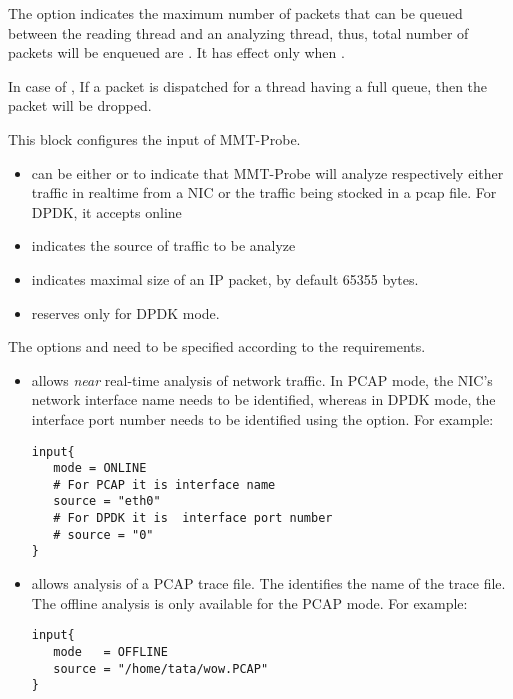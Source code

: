 The option indicates the maximum number of packets that can be queued between the reading thread and an analyzing thread,
thus, total number of packets will be enqueued are .
It has effect only when .

In case of , 
If a packet is dispatched for a thread having a full queue, then the packet will be dropped.


This block configures the input of MMT-Probe. 

\begin{itemize}
  \item {} can be either  or  to indicate that MMT-Probe will analyze respectively either traffic in realtime from a NIC or the traffic being stocked in a pcap file.
      For DPDK, it accepts online  
      
  \item {} indicates the source of traffic to be analyze
  \item {} indicates maximal size of an IP packet, by default 65355 bytes.
  \item {} reserves only for DPDK mode.
\end{itemize}


The options  and  need to be specified according to the requirements.

\begin{itemize}
\item{  } allows {\em near} real-time analysis of network traffic. 
In PCAP mode, the NIC's network interface name needs to be identified, whereas in DPDK mode, the interface port number needs to be identified using the  option.
For example:

\begin{lstlisting}[style=CONFIG]
input{
   mode = ONLINE
   # For PCAP it is interface name
   source = "eth0"
   # For DPDK it is  interface port number
   # source = "0"
}
\end{lstlisting}

\item{ } allows analysis of a PCAP trace file. 
The  identifies the name of the trace file. 
The offline analysis is only available for the PCAP mode.
For example:


\begin{lstlisting}[style=CONFIG]
input{
   mode   = OFFLINE
   source = "/home/tata/wow.PCAP"
}
\end{lstlisting}
      
\end{itemize}

